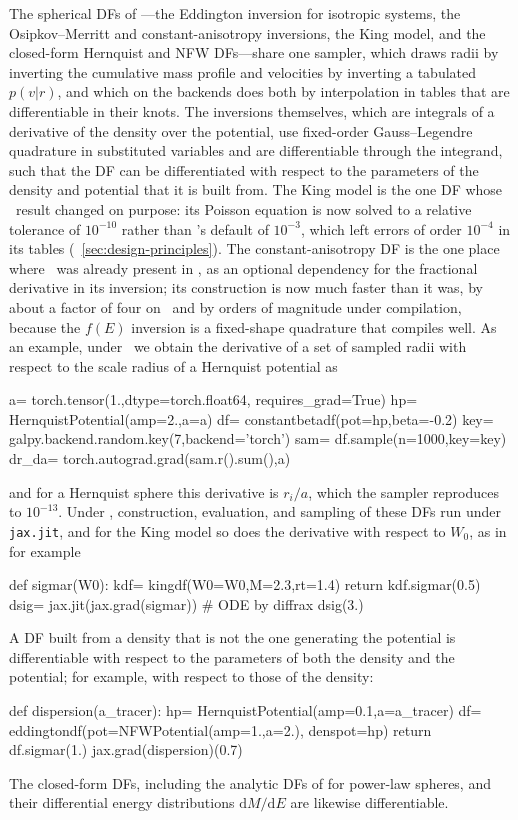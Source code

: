 The spherical DFs of \galpy---the Eddington inversion for isotropic
systems, the Osipkov--Merritt and constant-anisotropy inversions, the
King model, and the closed-form Hernquist and NFW DFs---share one
sampler, which draws radii by inverting the cumulative mass profile and
velocities by inverting a tabulated $p(v|r)$, and which on the backends
does both by interpolation in tables that are differentiable in their
knots. The inversions themselves, which are integrals of a derivative
of the density over the potential, use fixed-order Gauss--Legendre
quadrature in substituted variables and are differentiable through the
integrand, such that the DF can be differentiated with respect to the
parameters of the density and potential that it is built from. The
King model is the one DF whose \numpy\ result changed on purpose: its
Poisson equation is now solved to a relative tolerance of $10^{-10}$
rather than \scipy's default of $10^{-3}$, which left errors of order
$10^{-4}$ in its tables (\sectionname~\ref{sec:design-principles}). The
constant-anisotropy DF is the one place where \jax\ was already present
in \galpy, as an optional dependency for the fractional derivative in its
inversion; its construction is now much faster than it was, by about a
factor of four on \numpy\ and by orders of magnitude under
compilation, because the $f(E)$ inversion is a fixed-shape quadrature
that compiles well. As an example,
under \torch\ we obtain the derivative of a set of sampled radii with
respect to the scale radius of a Hernquist potential as
\begin{code}
a= torch.tensor(1.,dtype=torch.float64,
                requires_grad=True)
hp= HernquistPotential(amp=2.,a=a)
df= constantbetadf(pot=hp,beta=-0.2)
key= galpy.backend.random.key(7,backend='torch')
sam= df.sample(n=1000,key=key)
dr_da= torch.autograd.grad(sam.r().sum(),a)
\end{code}
and for a Hernquist sphere this derivative is $r_i/a$, which the sampler
reproduces to $10^{-13}$. Under \jax, construction, evaluation, and
sampling of these DFs run under \texttt{jax.jit}, and for the King
model so does the derivative with respect to $W_0$, as in for example
\begin{code}
def sigmar(W0):
    kdf= kingdf(W0=W0,M=2.3,rt=1.4)
    return kdf.sigmar(0.5)
dsig= jax.jit(jax.grad(sigmar)) # ODE by diffrax
dsig(3.)
\end{code}
A DF built from a density that is not the one generating the
potential is differentiable with respect to the parameters of both the
density and the potential; for example, with respect to those of the
density:
\begin{code}
def dispersion(a_tracer):
    hp= HernquistPotential(amp=0.1,a=a_tracer)
    df= eddingtondf(pot=NFWPotential(amp=1.,a=2.),
                    denspot=hp)
    return df.sigmar(1.)
jax.grad(dispersion)(0.7)
\end{code}
The closed-form DFs, including the analytic DFs of \citet{Evans1997}
for power-law spheres, and their differential energy distributions
$\mathrm{d}M/\mathrm{d}E$ are likewise differentiable.

